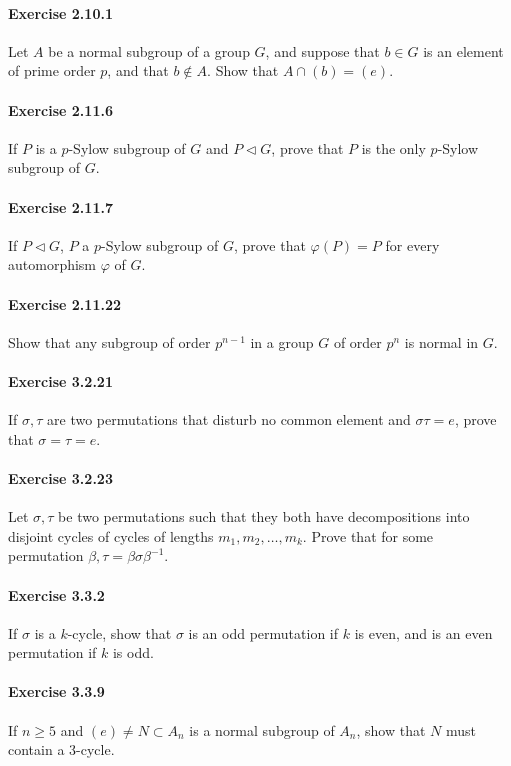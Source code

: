 \documentclass{article}
\begin{document}
\paragraph{Exercise 2.10.1}
Let $A$ be a normal subgroup of a group $G$, and suppose that $b \in G$ is an
element of prime order $p$, and that $b \not\in A$. Show that $A \cap (b) = (e)$.

\paragraph{Exercise 2.11.6}
If $P$ is a $p$-Sylow subgroup of $G$ and $P \triangleleft G$, prove that $P$ is
the only $p$-Sylow subgroup of $G$.

\paragraph{Exercise 2.11.7}
If $P \triangleleft G$, $P$ a $p$-Sylow subgroup of $G$, prove that $\varphi(P)
= P$ for every automorphism $\varphi$ of $G$.

\paragraph{Exercise 2.11.22}
Show that any subgroup of order $p^{n-1}$ in a group $G$ of order $p^n$ is
normal in $G$.

\paragraph{Exercise 3.2.21}
If $\sigma, \tau$ are two permutations that disturb no common element and
$\sigma \tau = e$, prove that $\sigma = \tau = e$.

\paragraph{Exercise 3.2.23}
Let $\sigma, \tau$ be two permutations such that they both have decompositions
into disjoint cycles of cycles of lengths $m_1, m_2, \ldots, m_k$. Prove that
for some permutation $\beta, \tau = \beta \sigma \beta^{-1}$.

\paragraph{Exercise 3.3.2}
If $\sigma$ is a $k$-cycle, show that $\sigma$ is an odd permutation if $k$ is
even, and is an even permutation if $k$ is odd.

\paragraph{Exercise 3.3.9}
If $n \geq 5$ and $(e) \neq N \subset A_n$ is a normal subgroup of $A_n$, show
that $N$ must contain a 3-cycle.
\end{document}
